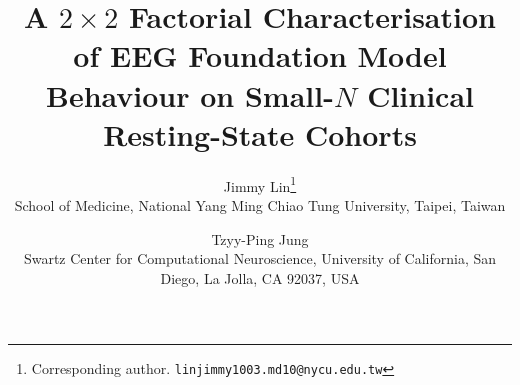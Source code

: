 \documentclass{article}
\title{A \(2\!\times\!2\) Factorial Characterisation of EEG Foundation
       Model Behaviour on Small-\(N\) Clinical Resting-State Cohorts}
\author{%
  Jimmy Lin\thanks{Corresponding author.
    \texttt{linjimmy1003.md10@nycu.edu.tw}} \\
  School of Medicine, National Yang Ming Chiao Tung University, Taipei, Taiwan \\
  \and
  Tzyy-Ping Jung \\
  Swartz Center for Computational Neuroscience,
  University of California, San Diego, La Jolla, CA 92037, USA
}
\begin{document}
\maketitle

% 

\FloatBarrier


\FloatBarrier

\FloatBarrier
% 
% 
% 
% 


\end{document}
